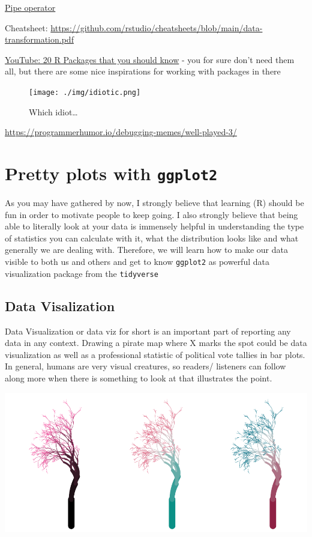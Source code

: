 \documentclass[
]{book}
\begin{document}
\href{https://r4ds.hadley.nz/data-transform.html\#sec-the-pipe}{Pipe operator}

Cheatsheet: \url{https://github.com/rstudio/cheatsheets/blob/main/data-transformation.pdf}

\href{https://www.youtube.com/watch?v=npOf6aXdguY&ab_channel=RichardOnData}{YouTube: 20 R Packages that you should know} - you for sure don't need them all, but there are some nice inspirations for working with packages in there

\begin{figure}
\centering
\texttt{[image: ./img/idiotic.png]}
\caption{Which idiot\ldots{}}\label{id}
\end{figure}

\url{https://programmerhumor.io/debugging-memes/well-played-3/}

\chapter{\texorpdfstring{Pretty plots with \texttt{ggplot2}}{Pretty plots with ggplot2}}\label{ggplot2}

As you may have gathered by now, I strongly believe that learning (R) should be fun in order to motivate people to keep going.
I also strongly believe that being able to literally look at your data is immensely helpful in understanding the type of statistics you can calculate with it, what the distribution looks like and what generally we are dealing with.
Therefore, we will learn how to make our data visible to both us and others and get to know \texttt{ggplot2} as powerful data visualization package from the \texttt{tidyverse}

\section{\texorpdfstring{Data Visalization }{Data Visalization }}\label{data-visalization}

Data Visualization or data viz for short is an important part of reporting any data in any context.
Drawing a pirate map where X marks the spot could be data visualization as well as a professional statistic of political vote tallies in bar plots.
In general, humans are very visual creatures, so readers/ listeners can follow along more when there is something to look at that illustrates the point.

\includegraphics{_main_files/figure-html/flametrees-1.pdf}
\end{document}
